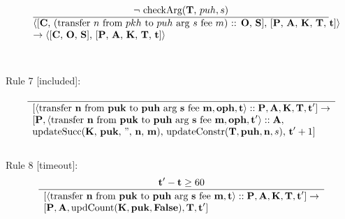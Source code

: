\documentclass[a4paper]{llncs}
\begin{document}
\begin{equation}{}
\frac{\text{$\neg$ checkArg(\CONTRACTORS, $puh, s$)}}{\parbox{4.2in}{\text{$\langle$[\ACCOUNTS, (transfer ${n}$ from ${pkh}$ to  ${puh}$ arg ${s}$ fee ${m}$) :: \OPERATIONS, \CONTRACTS], [\PENDING, \ACCEPTED, \MANAGERS, \CONTRACTORS, \TIME]$\rangle$}\\
\text{$\rightarrow \langle$[\ACCOUNTS, \OPERATIONS, \CONTRACTS], [\PENDING, \ACCEPTED, \MANAGERS, \CONTRACTORS, \TIME]$\rangle$}}} 
\end{equation}
~\\
~\\
Rule 7 [included]:

\begin{equation}
\frac{}{
  \begin{array}{l}
    {[\langle \TRANSFER[\STRING]\NTEZ\PUK\PUH\MTEZ, \OPH, \TIME
    \rangle :: \PENDING, \ACCEPTED, \MANAGERS, \CONTRACTORS, \TIME']}
    \rightarrow \\
    {}[\PENDING, \langle \TRANSFER[\STRING]\NTEZ\PUK\PUH\MTEZ, \OPH, \TIME' \rangle :: \ACCEPTED,  \\
    \text{updateSucc(\MANAGERS, \PUK, '', \NTEZ, \MTEZ), updateConstr$(\CONTRACTORS, \PUH, \NTEZ,
  s)$, $\TIME' + 1$]}
  \end{array}
}\label{eq:1}
\end{equation}
~\\
Rule 8 [timeout]:
\begin{equation}{}
  \frac{\TIME' - \TIME \ge 60}{
    \begin{array}{l}
      {}[\langle\TRANSFER[\STRING]\NTEZ\PUK\PUH\MTEZ, \TIME\rangle ::
      \PENDING, \ACCEPTED, \MANAGERS, \CONTRACTORS, \TIME' ]
      \rightarrow \\
      {}[\PENDING, \ACCEPTED, \UPDATECOU(\MANAGERS, \PUK, \FALSE), \CONTRACTORS, \TIME']
    \end{array}
    }
\end{equation}
\end{document}
